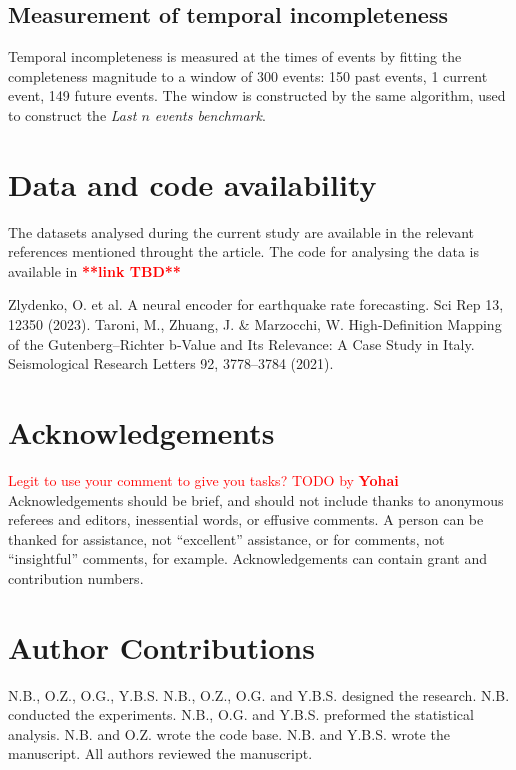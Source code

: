 \documentclass[pdflatex]{sn-jnl}
\newcommand{\yohai}[1]{{\textcolor{red}{#1}}}
\begin{document}
\subsection{Measurement of temporal incompleteness}
Temporal incompleteness is measured at the times of events by fitting the completeness magnitude to a window of 300 events: 150 past events, 1 current event, 149 future events. The window is constructed by the same algorithm, used to construct the \textit{Last $n$ events benchmark}.




\section*{Data and code availability}
The datasets analysed during the current study are available in the relevant references mentioned throught the article.
The code for analysing the data is available in \textcolor{red}{\textbf{**link TBD**}}

\newpage
\renewcommand\refname{Methods References}
\begin{thebibliography}{10}
Zlydenko, O. et al. A neural encoder for earthquake rate forecasting. Sci Rep 13, 12350 (2023).
Taroni, M., Zhuang, J. \& Marzocchi, W. High‐Definition Mapping of the Gutenberg–Richter b‐Value and Its Relevance: A Case Study in Italy. Seismological Research Letters 92, 3778–3784 (2021).
  





\end{thebibliography}


\newpage
\section*{Acknowledgements}
\yohai{Legit to use your comment to give you tasks? TODO by \textbf{Yohai}}
Acknowledgements should be brief, and should not include thanks to anonymous referees and editors, inessential words, or effusive comments. A person can be thanked for assistance, not “excellent” assistance, or for comments, not “insightful” comments, for example. Acknowledgements can contain grant and contribution numbers.

\section*{Author Contributions}
N.B., O.Z., O.G., Y.B.S.
N.B., O.Z., O.G. and Y.B.S. designed the research. N.B. conducted the experiments. N.B., O.G. and Y.B.S. preformed the statistical analysis. N.B. and O.Z. wrote the code base. N.B. and Y.B.S. wrote the manuscript. All authors reviewed the manuscript.
\end{document}
